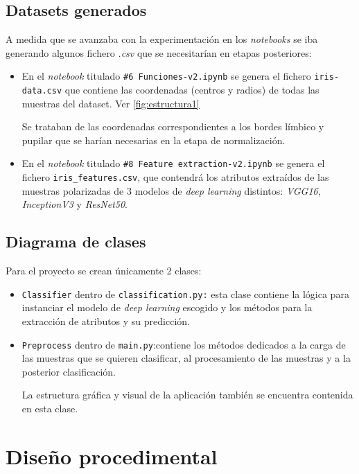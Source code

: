 \subsection{Datasets generados}
A medida que se avanzaba con la experimentación en los \emph{notebooks} se iba generando algunos fichero \emph{.csv} que se necesitarían en etapas posteriores:
\begin{itemize}
    \item En el \emph{notebook} titulado \texttt{\#6 Funciones-v2.ipynb} se genera el fichero \texttt{iris-data.csv} que contiene las coordenadas (centros y radios) de todas las muestras del dataset. Ver \ref{fig:estructura1}
    
    Se trataban de las coordenadas correspondientes a los bordes límbico y pupilar que se harían necesarias en la etapa de normalización. 
    \item En el \emph{notebook} titulado \texttt{\#8 Feature extraction-v2.ipynb} se genera el fichero \texttt{iris\_features.csv}, que contendrá los atributos extraídos de las muestras polarizadas de 3 modelos de \emph{deep learning} distintos: \emph{VGG16}, \emph{InceptionV3} y \emph{ResNet50}.
\end{itemize}

\subsection{Diagrama de clases}
Para el proyecto se crean únicamente 2 clases:
\begin{itemize}
    \item \texttt{Classifier} dentro de \texttt{classification.py:} esta clase contiene la lógica para instanciar el modelo de \emph{deep learning} escogido y los métodos para la extracción de atributos y su predicción.
    \item \texttt{Preprocess} dentro de \texttt{main.py}:contiene los métodos dedicados a la carga de las muestras que se quieren clasificar, al procesamiento de las muestras y a la posterior clasificación.
    
    La estructura gráfica y visual de la aplicación también se encuentra contenida en esta clase.
\end{itemize}
\section{Diseño procedimental}
